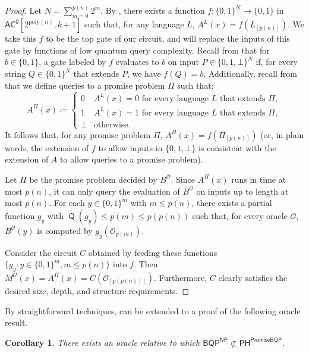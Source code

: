\documentclass[11pt]{article}%
\newtheorem{corollary}[theorem]{Corollary}
\newcommand{\poly}{\mathrm{poly}}
\DeclareMathOperator{\Q}{\mathsf{Q}}
\begin{document}
\begin{proof}
Let $N = \sum_{m=0}^{p(n)} 2^{m}$. By , there exists a function $f: \{0,1\}^N \to \{0,1\}$ in $\mathsf{AC^0}\left[2^{\poly(n)}, k+1\right]$ such that, for any language $L$, $A^{L}(x) = f\left(L_{[p(n)]}\right)$. We take this $f$ to be the top gate of our circuit, and will replace the inputs of this gate by functions of low quantum query complexity. Recall from  that for $b \in \{0,1\}$, a gate labeled by $f$ evaluates to $b$ on input $P \in \{0,1,\bot\}^N$ if, for every string $Q \in \{0,1\}^N$ that extends $P$, we have $f(Q) = b$. Additionally, recall from  that we define queries to a promise problem $\Pi$ such that:
\[
A^\Pi(x) \coloneqq \begin{cases}
0 & A^L(x) = 0 \text{ for every language } L \text{ that extends } \Pi,\\
1 & A^L(x) = 1 \text{ for every language } L \text{ that extends } \Pi,\\
\bot & \text{otherwise}.
\end{cases}
\]
It follows that, for any promise problem $\Pi$, $A^{\Pi}(x) = f\left(\Pi_{[p(n)]}\right)$ (or, in plain words, the extension of $f$ to allow inputs in $\{0,1,\bot\}$ is consistent with the extension of $A$ to allow queries to a promise problem).

Let $\Pi$ be the promise problem decided by $B^\mathcal{O}$. Since $A^\Pi(x)$ runs in time at most $p(n)$, it can only query the evaluation of $B^\mathcal{O}$ on inputs up to length at most $p(n)$. For each $y \in \{0,1\}^{m}$ with $m \le p(n)$, there exists a partial function $g_y$ with $\Q(g_y) \le p(m) \le p(p(n))$ such that, for every oracle $\mathcal{O}$, $B^\mathcal{O}(y)$ is computed by $g_y\left(\mathcal{O}_{p(m)} \right)$.

Consider the circuit $C$ obtained by feeding these functions $\{g_y : y \in \{0,1\}^{m}, m \le p(n)\}$ into $f$. Then $M^\mathcal{O}(x) = A^{\Pi}(x) = C\left(\mathcal{O}_{[p(p(n))]}\right)$. Furthermore, $C$ clearly satisfies the desired size, depth, and structure requirements.
\end{proof}

By straightforward techniques,  can be extended to a proof of the following oracle result.

\begin{corollary}
\label{cor:bqp^np_not_in_ph^bqp}
There exists an oracle relative to which $\mathsf{BQP}^\mathsf{NP} \not\subset \mathsf{PH}^\mathsf{PromiseBQP}$.
\end{corollary}
\end{document}
